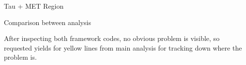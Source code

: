 \documentclass[8pt]{beamer}
\begin{document}
\begin{frame}{Tau + MET Region}
\begin{block}{Comparison between analysis}
 
\centering
{}

\end{block}

After inspecting both framework codes, no obvious problem is visible, so requested yields for yellow lines from main analysis for tracking down where the problem is.

\end{frame}
\end{document}
